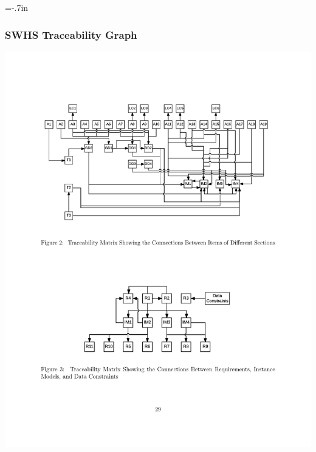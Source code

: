 \documentclass{beamer}
\begin{document}

\hoffset=-.7in %

\begin{frame}

\frametitle{SWHS Traceability Graph}

\begin{center}
\includegraphics[scale=0.75]{TraceGraph.pdf}
\end{center}

\end{frame}
\hoffset=0in
\end{document}
